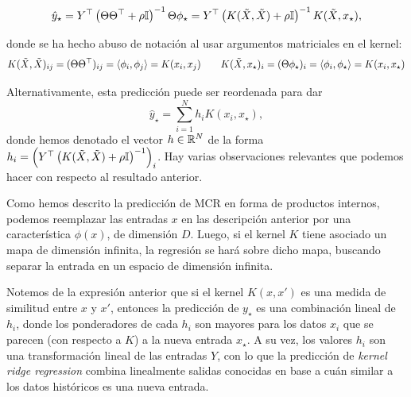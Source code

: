 \begin{equation}
    \hat{y}_\star = Y^\top \left(\Theta\Theta^\top + \rho{\mathbb I}\right)^{-1}\Theta \phi_\star  = Y^\top \left(K(\tilde{X},\tilde{X}) + \rho{\mathbb I}\right) ^{-1} K(\tilde{X}, x_\star),    
\end{equation}

donde se ha hecho abuso de notación al usar argumentos matriciales en el kernel:
\begin{equation}
    K(\tilde{X},\tilde{X})_{ij} = (\Theta\Theta^\top)_{ij} = \langle\phi_i,\phi_j\rangle = K(x_i,x_j)\qquad K(\tilde{X},x_\star)_i = (\Theta\phi_\star)_i = \langle\phi_i,\phi_\star\rangle = K(x_i,x_\star)
\end{equation}

Alternativamente, esta predicción puede ser reordenada para dar 
\begin{equation}
   \hat{y}_\star    = \sum_{i=1}^N h_i K(x_i,x_\star)\label{eq:RR_pred2},
\end{equation}
donde hemos denotado el vector $h\in\mathbb{R}^N$ de la forma $h_i = \left(Y^\top \left(K(\tilde{X},\tilde{X}) + \rho{\mathbb I}\right) ^{-1}\right)_i$. Hay varias observaciones relevantes que podemos hacer con respecto al resultado anterior. 

\begin{remark}
Como hemos descrito la predicción de MCR en forma de productos internos, podemos reemplazar las entradas $x$ en las descripción anterior por una característica $\phi(x)$, de dimensión $D$. Luego, si el kernel $K$ tiene asociado un mapa de dimensión infinita, la regresión se hará sobre dicho mapa, buscando separar la entrada en un espacio de dimensión infinita. 
\end{remark}


\begin{remark}
    Notemos de la expresión anterior que si el kernel $K(x,x')$ es una medida de similitud entre $x$ y $x'$, entonces la predicción de $y_\star$ es una combinación lineal de $h_i$, donde los ponderadores de cada $h_i$ son mayores para los datos $x_i$ que se parecen (con respecto a $K$) a la nueva entrada $x_\star$. A su vez, los valores $h_i$ son una transformación lineal de las entradas $Y$, con lo que la predicción de \emph{kernel ridge regression} combina linealmente salidas conocidas en base a cuán similar a los datos históricos es una nueva entrada. 
\end{remark}

